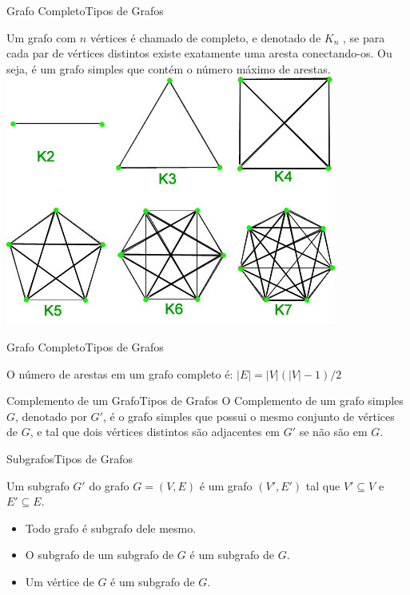 \documentclass[t]{beamer}
\begin{document}
\begin{ftst}{Grafo Completo}{Tipos de Grafos}

Um grafo com $n$ vértices é chamado de completo, e denotado de $K_n$ , se para cada par de vértices distintos existe exatamente uma aresta conectando-os. Ou seja, é um grafo simples que contém o número máximo de arestas.
\vone
\centering
\includegraphics[scale=0.4]{Figuras/grafo_completo.jpg}


\end{ftst}


\begin{ftst}{Grafo Completo}{Tipos de Grafos}

O número de arestas em um grafo completo é: 
\vone
\centering
\huge
$|E| = |V| (|V| - 1) / 2$


\end{ftst}


\begin{ftst}{Complemento de um Grafo}{Tipos de Grafos}
\justifying
O Complemento de um grafo simples $G$, denotado por $G'$, é o grafo simples que possui o mesmo conjunto de vértices de $G$, e tal que dois vértices distintos são adjacentes em $G'$ se não são em $G$.
\vone
\vone
\centering
\\

\end{ftst}


\begin{ftst}{Subgrafos}{Tipos de Grafos}

Um subgrafo $G'$ do grafo $G = (V,E)$ é um grafo $(V',E')$ tal que $V' \subseteq V$ e $E' \subseteq E$.                    

\begin{itemize}
    \item Todo grafo é subgrafo dele mesmo.
    \item O subgrafo de um subgrafo de $G$ é um subgrafo de $G$.
    \item Um vértice de $G$ é um subgrafo de $G$.
\end{itemize}
\vone
\centering
\\

\end{ftst}
\end{document}
